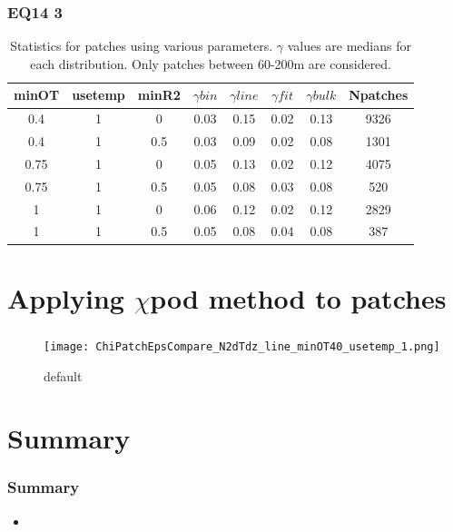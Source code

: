 \documentclass{beamer}
\begin{document}
\begin{frame}
 \frametitle{ EQ14 3}

\begin{table}[htdp]
\caption{Statistics for patches using various parameters. $\gamma$ values are medians for each distribution. Only patches between 60-200m are considered.}
\begin{center}
\begin{tabular}{|c|c|c|c|c|c|c|c|}
\hline
minOT & usetemp & minR2 & $\gamma bin$ & $\gamma line$ & $\gamma fit$ & $\gamma bulk$ & Npatches \\
\hline
0.4 & 1 & 0 & 0.03 & 0.15 & 0.02 & 0.13 & 9326 \\
\hline
0.4 & 1 & 0.5 & 0.03 & 0.09 & 0.02 & 0.08 & 1301 \\
\hline
0.75 & 1 & 0 & 0.05 & 0.13 & 0.02 & 0.12 & 4075 \\
\hline
0.75 & 1 & 0.5 & 0.05 & 0.08 & 0.03 & 0.08 & 520 \\
\hline
1 & 1 & 0 & 0.06 & 0.12 & 0.02 & 0.12 & 2829 \\
\hline
1 & 1 & 0.5 & 0.05 & 0.08 & 0.04 & 0.08 & 387 \\
\hline
\hline
\hline
\end{tabular}
\end{center}
\label{tab}
\end{table}%


\end{frame}


\section{Applying $\chi$pod method to patches}

\begin{frame}
 \frametitle{ }
 
 \begin{figure}[htbp]
\begin{center}
\texttt{[image: ChiPatchEpsCompare\_N2dTdz\_line\_minOT40\_usetemp\_1.png]}
\caption{default}
\label{default}
\end{center}
\end{figure}


\end{frame}




\section{Summary}

\begin{frame}
 \frametitle{ Summary}

\begin{itemize}
\item 
\end{itemize}


\end{frame}



\end{document}
